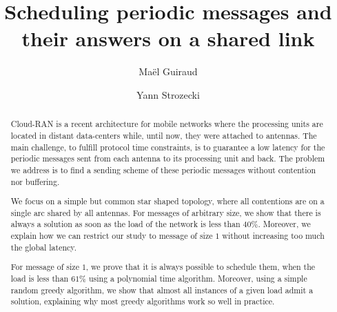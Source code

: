 \documentclass[10pt, conference, letterpaper]{IEEEtran}
\title{Scheduling periodic messages and their answers on a shared link}
\author[1,2]{Ma\"el Guiraud}
\author[1]{Yann Strozecki}
\affil[1]{David Laboratory, UVSQ}
\affil[2]{Nokia Bell Labs France}
\begin{document}
\maketitle








\begin{abstract}

Cloud-RAN is a recent architecture for mobile networks where the processing units are located in distant data-centers while, until now, they were attached to antennas. The main challenge, to fulfill protocol time constraints, is to guarantee a low latency for the periodic messages sent from each antenna to its processing unit and back. The problem we address is to find a sending scheme of these periodic messages without contention nor buffering.

We focus on a simple but common star shaped topology, where all contentions are on a single arc shared by all antennas. For messages of arbitrary size, we show that there is always a solution as soon as the load of the network is less than $40\%$. Moreover, we explain how we can restrict our study to message of size $1$ without increasing too much the global latency. 

For message of size $1$, we prove that it is always possible to schedule them, when the load is less than $61\%$  using a polynomial time algorithm. Moreover, using a simple random greedy algorithm, we show that almost all instances of a given load admit a solution, explaining why most greedy algorithms work so well in practice.  
\end{abstract}
\end{document}

